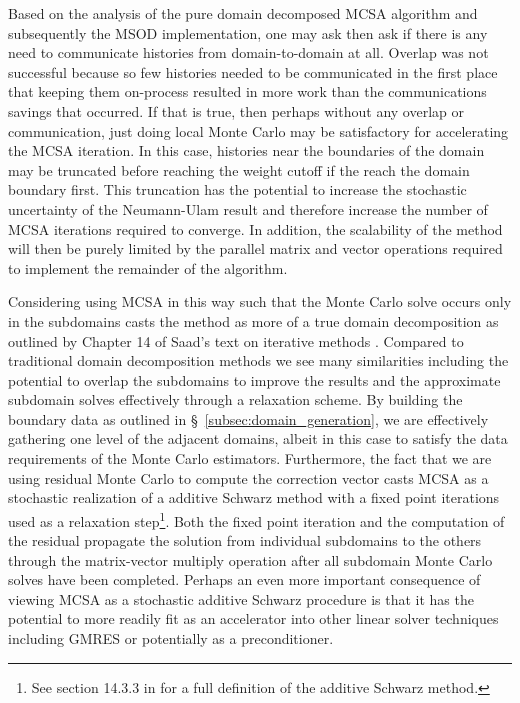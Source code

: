 Based on the analysis of the pure domain decomposed MCSA algorithm and
subsequently the MSOD implementation, one may ask then ask if there is
any need to communicate histories from domain-to-domain at all. Overlap
was not successful because so few histories needed to be communicated
in the first place that keeping them on-process resulted in more work
than the communications savings that occurred. If that is true, then
perhaps without any overlap or communication, just doing local Monte
Carlo may be satisfactory for accelerating the MCSA iteration. In this
case, histories near the boundaries of the domain may be truncated
before reaching the weight cutoff if the reach the domain boundary
first. This truncation has the potential to increase the stochastic
uncertainty of the Neumann-Ulam result and therefore increase the
number of MCSA iterations required to converge. In addition, the
scalability of the method will then be purely limited by the parallel
matrix and vector operations required to implement the remainder of
the algorithm.

Considering using MCSA in this way such that the Monte Carlo solve
occurs only in the subdomains casts the method as more of a true
domain decomposition as outlined by Chapter 14 of Saad's text on
iterative methods \citep{saad_iterative_2003}. Compared to traditional
domain decomposition methods we see many similarities including the
potential to overlap the subdomains to improve the results and the
approximate subdomain solves effectively through a relaxation
scheme. By building the boundary data as outlined in
\S~\ref{subsec:domain_generation}, we are effectively gathering one
level of the adjacent domains, albeit in this case to satisfy the data
requirements of the Monte Carlo estimators. Furthermore, the fact that
we are using residual Monte Carlo to compute the correction vector
casts MCSA as a stochastic realization of a additive Schwarz method
with a fixed point iterations used as a relaxation step\footnote{See
  section 14.3.3 in \citep{saad_iterative_2003} for a full definition
  of the additive Schwarz method.}. Both the fixed point iteration and
the computation of the residual propagate the solution from individual
subdomains to the others through the matrix-vector multiply operation
after all subdomain Monte Carlo solves have been completed. Perhaps an
even more important consequence of viewing MCSA as a stochastic
additive Schwarz procedure is that it has the potential to more
readily fit as an accelerator into other linear solver techniques
including GMRES or potentially as a preconditioner.


